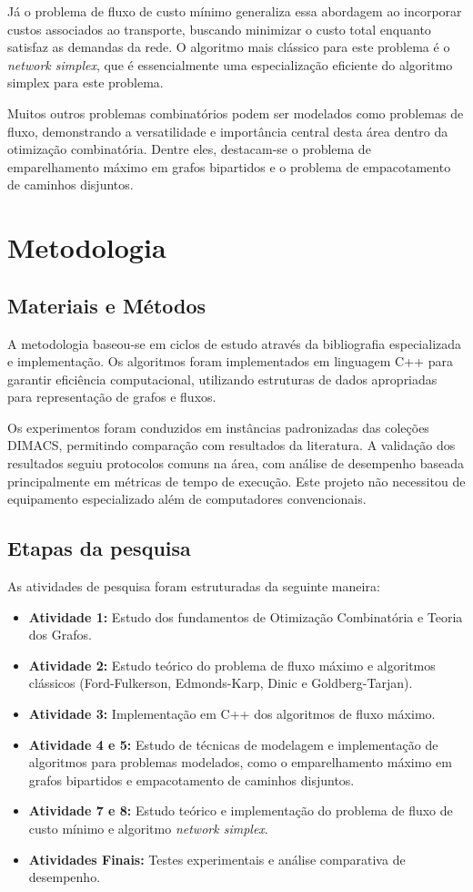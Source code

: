 \documentclass[12pt,a4paper]{article}
\begin{document}
Já o problema de fluxo de custo mínimo generaliza essa abordagem ao incorporar custos associados ao transporte, buscando minimizar o custo total enquanto satisfaz as demandas da rede. O algoritmo mais clássico para este problema é o \textit{network simplex}, que é essencialmente uma especialização eficiente do algoritmo simplex para este problema. 

Muitos outros problemas combinatórios podem ser modelados como problemas de fluxo, demonstrando a versatilidade e importância central desta área dentro da otimização combinatória. Dentre eles, destacam-se o problema de emparelhamento máximo em grafos bipartidos e o problema de empacotamento de caminhos disjuntos.

\section{Metodologia}

\subsection{Materiais e Métodos}
A metodologia baseou-se em ciclos de estudo através da bibliografia especializada e implementação. Os algoritmos foram implementados em linguagem C++ para garantir eficiência computacional, utilizando estruturas de dados apropriadas para representação de grafos e fluxos. 

Os experimentos foram conduzidos em instâncias padronizadas das coleções DIMACS, permitindo comparação com resultados da literatura. A validação dos resultados seguiu protocolos comuns na área, com análise de desempenho baseada principalmente em métricas de tempo de execução. Este projeto não necessitou de equipamento especializado além de computadores convencionais.

\subsection{Etapas da pesquisa}
As atividades de pesquisa foram estruturadas da seguinte maneira:
\begin{itemize}
    \item \textbf{Atividade 1:} Estudo dos fundamentos de Otimização Combinatória e Teoria dos Grafos.
    \item \textbf{Atividade 2:} Estudo teórico do problema de fluxo máximo e algoritmos clássicos (Ford-Fulkerson, Edmonds-Karp, Dinic e Goldberg-Tarjan).
    \item \textbf{Atividade 3:} Implementação em C++ dos algoritmos de fluxo máximo.
    \item \textbf{Atividade 4 e 5:} Estudo de técnicas de modelagem e implementação de algoritmos para problemas modelados, como o emparelhamento máximo em grafos bipartidos e empacotamento de caminhos disjuntos.
    \item \textbf{Atividade 7 e 8:} Estudo teórico e implementação do problema de fluxo de custo mínimo e algoritmo \textit{network simplex}.
    \item \textbf{Atividades Finais:} Testes experimentais e análise comparativa de desempenho.
\end{itemize}
\end{document}
